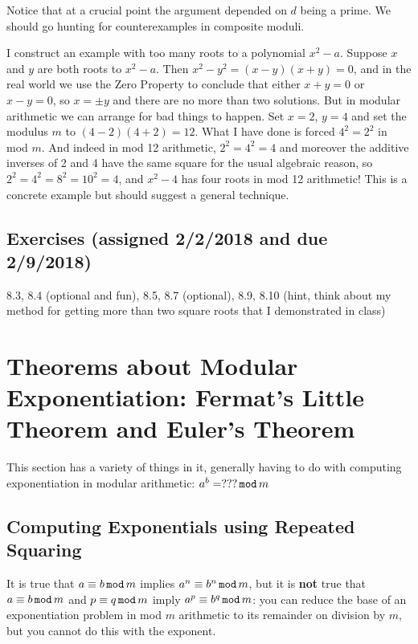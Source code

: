 \documentclass[12pt]{article}
\begin{document}
Notice that at a crucial point the argument depended on $d$ being a prime.   We should go hunting for counterexamples in composite moduli.

I construct an example with too many roots to a polynomial $x^2-a$.   Suppose $x$ and $y$ are both roots to
$x^2-a$.  Then $x^2-y^2=(x-y)(x+y)=0$, and in the real world we use the Zero Property to conclude that either
$x+y=0$ or $x-y=0$, so $x=\pm y$ and there are no more than two solutions.  But in modular arithmetic we can arrange for bad things to happen.   Set $x=2$, $y=4$ and set the modulus $m$ to $(4-2)(4+2)=12$.   What I have done is forced
$4^2=2^2$ in mod $m$.  And indeed in mod 12 arithmetic, $2^2=4^2=4$ and moreover the additive inverses of 2
and 4 have the same square for the usual algebraic reason, so $2^2=4^2=8^2=10^2=4$, and $x^2-4$ has four roots in mod 12 arithmetic!   This is a concrete example but should suggest a general technique.

\subsection{Exercises (assigned 2/2/2018 and due 2/9/2018)}

8.3, 8.4 (optional and fun), 8.5, 8.7 (optional), 8.9, 8.10 (hint, think about my method for getting more than two square roots that I demonstrated in class)

\section{Theorems about Modular Exponentiation:  Fermat's Little Theorem and Euler's Theorem}

This section has a variety of things in it, generally having to do with computing exponentiation in modular arithmetic:   $a^b=???\,{\tt mod}\,m$

\subsection{Computing Exponentials using Repeated Squaring}

It is true that $a \equiv b\,{\tt mod}\,m$ implies $a^n\equiv b^n\,{\tt mod}\,m$, but it is {\bf not} true that $a\equiv b\,{\tt mod}\,m$ and $p \equiv q\,{\tt mod} \,m$ imply $a^p \equiv b^q\,{\tt mod}\,m$:  you can reduce the base
of an exponentiation problem in mod $m$ arithmetic to its remainder on division by $m$, but you cannot do this with the exponent.
\end{document}
